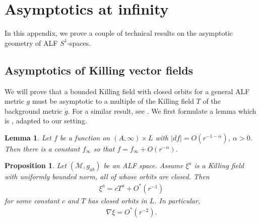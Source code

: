 \documentclass[a4paper,11pt,reqno]{amsart}
\newcommand{\cM}{\mathcal{M}}
\theoremstyle{plain}
\newtheorem{lemma}[thm]{Lemma}
\newtheorem{prop}[thm]{Proposition}
\newcommand{\gring}{\mathring{g}}
\numberwithin{equation}{section}
\begin{document}
\section{Asymptotics at infinity} \label{sec:asympinf}
In this appendix, we prove a couple of technical results on the asymptotic geometry of ALF $S^1$-spaces.  

\subsection{Asymptotics of Killing vector fields} \label{sec:asympKill}

We will prove that a bounded Killing field with closed orbits for a general ALF metric $g$ must be asymptotic to a multiple of the Killing field $T$ of the background metric $\gring$. For a similar result, see \cite[Proposition~2.1]{Beig-Chrusciel-96}. 
We first formulate a lemma which is \cite[Lemma,~Appendix~A]{Chrusciel-88}, adapted to our setting.

\begin{lemma} \label{lemma-piotr-limit}
Let $f$ be a function on $ (A,\infty) \times L$ with $|df| = O(r^{-1-\alpha})$, $\alpha >0$. Then there is a constant $f_\infty$ so that $f = f_\infty + O(r^{-\alpha})$. 
\end{lemma}
\begin{prop} \label{prop-asymptotics-killing}
Let $(\cM, g_{ab})$ be an ALF space. Assume $\xi^a$ is a Killing field with uniformly bounded norm, all of whose orbits are closed. 
Then  
\begin{align} \label{eq:xiO*}
\xi^a = cT^a + O^*(r^{-1})
\end{align} 
for some constant $c$ and $T$ has closed orbits in $L$. In particular, 
\begin{align} \label{eq:nablaxiO*}
\nabla\xi = O^*(r^{-2}).
\end{align}  
\end{prop}
\end{document}
